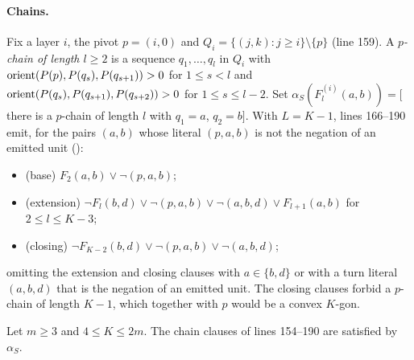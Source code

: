 \paragraph{Chains.} Fix a layer $i$, the pivot $p=(i,0)$ and $Q_i=\{(j,k):j\ge i\}\setminus\{p\}$ (line 159). A
\emph{$p$-chain of length $l\ge2$} is a sequence $q_1,\dots,q_l$ in $Q_i$ with $\operatorname{orient}(P(p),P(q_s),P(q_{s+1}))>0$ for
$1\le s<l$ and $\operatorname{orient}(P(q_s),P(q_{s+1}),P(q_{s+2}))>0$ for $1\le s\le l-2$. Set
$\alpha_S(F^{(i)}_l(a,b))=[$there is a $p$-chain of length $l$ with $q_1=a$, $q_2=b]$. With $L=K-1$, lines 166--190 emit,
for the pairs $(a,b)$ whose literal $(p,a,b)$ is not the negation of an emitted unit ():
\begin{itemize}
\item (base) $F_2(a,b)\vee\neg$$(p,a,b)$;
\item (extension) $\neg F_l(b,d)\vee\neg$$(p,a,b)\vee\neg$$(a,b,d)\vee F_{l+1}(a,b)$ for $2\le l\le K-3$;
\item (closing) $\neg F_{K-2}(b,d)\vee\neg$$(p,a,b)\vee\neg$$(a,b,d)$;
\end{itemize}
omitting the extension and closing clauses with $a\in\{b,d\}$ or with a turn literal $(a,b,d)$ that is the
negation of an emitted unit. The closing clauses forbid a $p$-chain of length $K-1$, which together with $p$ would be a
convex $K$-gon.

\begin{lemma}\label{k8s:lem:chain}
Let $m\ge3$ and $4\le K\le2m$. The chain clauses of lines 154--190 are satisfied by $\alpha_S$.
\end{lemma}


